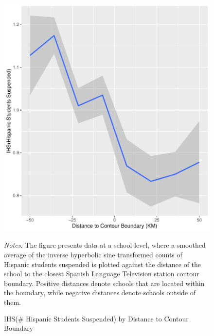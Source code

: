 \documentclass[11pt]{article}
\begin{document}
\begin{figure}[!hbtp]
\centering
\caption{IHS(\# Hispanic Students Suspended) by Distance to Contour Boundary }\label{suspensionsfig}
\includegraphics[width=12cm]{../../analysis/Output/graphs/hispanicsuspensions.pdf}

\textit{Notes:} The figure presents data at a school level, where a smoothed average of the inverse hyperbolic sine transformed counts of Hispanic students suspended is plotted against the distance of the school to the closest Spanish Language Television station contour boundary. Positive distances denote schools that are located within the boundary, while negative distances denote schools outside of them.
\end{figure} 

%
\end{document}
